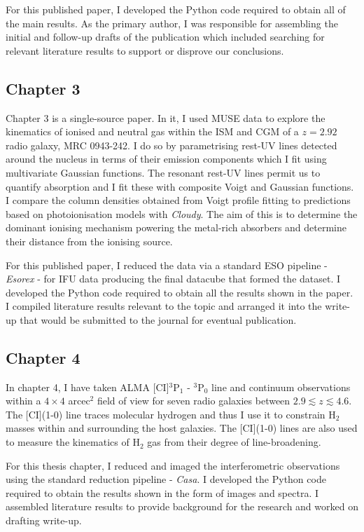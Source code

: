 \documentclass[10pt,a4paper,draft]{article}
\begin{document}
For this published paper, I developed the Python code required to obtain all of the main results. As the primary author, I was responsible for assembling the initial and follow-up drafts of the publication which included searching for relevant literature results to support or disprove our conclusions. 

\subsection{Chapter 3}
Chapter 3 is a single-source paper. In it, I used MUSE data to explore the kinematics of ionised and neutral gas within the ISM and CGM of a $z=2.92$ radio galaxy, MRC 0943-242. I do so by parametrising rest-UV lines detected around the nucleus in terms of their emission components which I fit using multivariate Gaussian functions. The resonant rest-UV lines permit us to quantify absorption and I fit these with composite Voigt and Gaussian functions. I compare the column densities obtained from Voigt profile fitting to predictions based on photoionisation models with {\it Cloudy}. The aim of this is to determine the dominant ionising mechanism powering the metal-rich absorbers and determine their distance from the ionising source. 

For this published paper, I reduced the data via a standard ESO pipeline - {\it Esorex} - for IFU data producing the final datacube that formed the dataset. I developed the Python code required to obtain all the results shown in the paper. I compiled literature results relevant to the topic and arranged it into the write-up that would be submitted to the journal for eventual publication.  

\subsection{Chapter 4}
In chapter 4, I have taken ALMA [CI]$^3$P$_1$ - $^3$P$_0$ line and continuum observations within a $4 \times 4$ arcec$^2$ field of view for seven radio galaxies between $2.9 \lesssim z \lesssim 4.6.$ The [CI](1-0) line traces molecular hydrogen and thus I use it to constrain H$_2$ masses within and surrounding the host galaxies. The [CI](1-0) lines are also used to measure the kinematics of H$_2$ gas from their degree of line-broadening. 

For this thesis chapter, I reduced and imaged the interferometric observations using the standard reduction pipeline - {\it Casa}. I developed the Python code required to obtain the results shown in the form of images and spectra. I assembled literature results to provide background for the research and worked on drafting write-up. 
\end{document}
